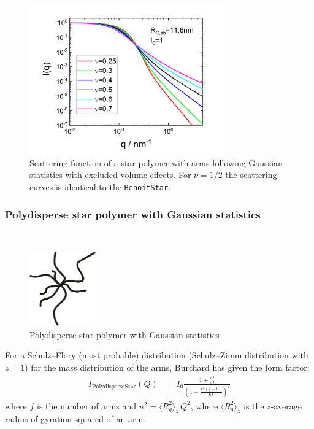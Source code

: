 \begin{figure}[htb]
\begin{center}
\includegraphics[width=0.75\textwidth]{../images/form_factor/stars/StarGaussExclVolIQ.png}
\end{center}
\caption{Scattering function of a star polymer with arms following Gaussian statistics with excluded volume effects. For $\nu=1/2$ the scattering curves is identical to the \texttt{BenoitStar}. } \label{fig:StarSemiFlexible_Iq}
\end{figure}


\clearpage
\subsubsection{Polydisperse star polymer with Gaussian statistics \cite{Burchard1974}}
\label{sect:PolydisperseStar}
~\\
\begin{figure}[htb]
\begin{center}
\includegraphics[width=0.2545\textwidth,height=0.2535\textwidth]{polyBenoit.png}
\end{center}
\caption{Polydisperse star polymer with Gaussian statistics} \label{fig:polyBenoitStar}
\end{figure}

For a Schulz–Flory (most probable) distribution (Schulz–Zimm distribution
with $z = 1$) for the mass distribution of the arms, Burchard \cite{Burchard1974} has given the form factor:
\begin{align}
I_\text{PolydisperseStar}(Q) &= I_0
\frac{1+\frac{u^2}{3 f}}{\left(1+\frac{u^2(f +1)}{6 f }\right)^2}
\end{align}
where $f$ is the number of arms and $u^2 = \langle R_g^2 \rangle_z \,Q^2$, where
$\langle R_g^2 \rangle_z$ is the $z$-average radius of gyration squared of an arm.

